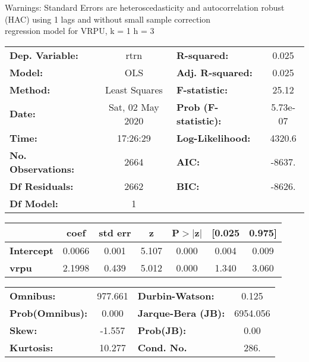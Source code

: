 Warnings: \newline
 [1] Standard Errors are heteroscedasticity and autocorrelation robust (HAC) using 1 lags and without small sample correction\\ 

regression model for VRPU, k = 1 h = 3\begin{center}
\begin{tabular}{lclc}
\toprule
\textbf{Dep. Variable:}    &       rtrn       & \textbf{  R-squared:         } &     0.025   \\
\textbf{Model:}            &       OLS        & \textbf{  Adj. R-squared:    } &     0.025   \\
\textbf{Method:}           &  Least Squares   & \textbf{  F-statistic:       } &     25.12   \\
\textbf{Date:}             & Sat, 02 May 2020 & \textbf{  Prob (F-statistic):} &  5.73e-07   \\
\textbf{Time:}             &     17:26:29     & \textbf{  Log-Likelihood:    } &    4320.6   \\
\textbf{No. Observations:} &        2664      & \textbf{  AIC:               } &    -8637.   \\
\textbf{Df Residuals:}     &        2662      & \textbf{  BIC:               } &    -8626.   \\
\textbf{Df Model:}         &           1      & \textbf{                     } &             \\
\bottomrule
\end{tabular}
\begin{tabular}{lcccccc}
                   & \textbf{coef} & \textbf{std err} & \textbf{z} & \textbf{P$> |$z$|$} & \textbf{[0.025} & \textbf{0.975]}  \\
\midrule
\textbf{Intercept} &       0.0066  &        0.001     &     5.107  &         0.000        &        0.004    &        0.009     \\
\textbf{vrpu}      &       2.1998  &        0.439     &     5.012  &         0.000        &        1.340    &        3.060     \\
\bottomrule
\end{tabular}
\begin{tabular}{lclc}
\textbf{Omnibus:}       & 977.661 & \textbf{  Durbin-Watson:     } &    0.125  \\
\textbf{Prob(Omnibus):} &   0.000 & \textbf{  Jarque-Bera (JB):  } & 6954.056  \\
\textbf{Skew:}          &  -1.557 & \textbf{  Prob(JB):          } &     0.00  \\
\textbf{Kurtosis:}      &  10.277 & \textbf{  Cond. No.          } &     286.  \\
\bottomrule
\end{tabular}
\end{center}

